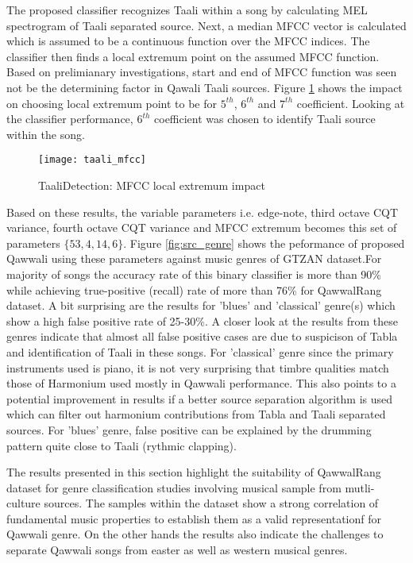 \documentclass{article}
\begin{document}
The proposed classifier recognizes Taali within a song by calculating MEL spectrogram of Taali separated source. Next, a median MFCC vector is calculated which is assumed to be a continuous function over the MFCC indices. The classifier then finds a local extremum point on the assumed MFCC function. Based on prelimianary investigations, start and end of MFCC function was seen not be the determining factor in Qawali Taali sources. Figure \ref{fig:src_mfcc} shows the impact on choosing local extremum point to be for $5^{th}$, $6^{th}$ and $7^{th}$ coefficient. Looking at the classifier performance, $6^{th}$ coefficient was chosen to identify Taali source within the song.
\begin{figure}[htbp]
  \centering
  \texttt{[image: taali\_mfcc]}
  \caption{TaaliDetection: MFCC local extremum impact}
\label{fig:src_mfcc}
\end{figure}

Based on these results, the variable parameters i.e. edge-note, third octave CQT variance, fourth octave CQT variance and MFCC extremum becomes this set of parameters $\{53, 4, 14, 6\}$. Figure \ref{fig:src_genre} shows the peformance of proposed Qawwali using these parameters against music genres of GTZAN dataset.For majority of songs the accuracy rate of this binary classifier is more than 90\% while achieving true-positive (recall) rate of more than 76\% for QawwalRang dataset. A bit surprising are the results for 'blues' and 'classical' genre(s) which show a high false positive rate of 25-30\%. A closer look at the results from these genres indicate that almost all false positive cases are due to suspicison of Tabla and identification of Taali in these songs. For 'classical' genre since the primary instruments used is piano, it is not very surprising that timbre qualities match those of Harmonium used mostly in Qawwali performance. This also points to a potential improvement in results if a better source separation algorithm is used which can filter out harmonium contributions from Tabla and Taali separated sources. For 'blues' genre, false positive can be explained by the drumming pattern quite close to Taali (rythmic clapping).

The results presented in this section highlight the suitability of QawwalRang dataset for genre classification studies involving musical sample from mutli-culture sources. The samples within the dataset show a strong correlation of fundamental music properties to establish them as a valid representationf for Qawwali genre. On the other hands the results also indicate the challenges to separate Qawwali songs from easter as well as western musical genres.
 
\end{document}

